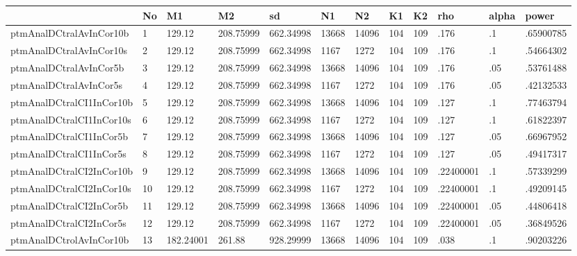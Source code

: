 \begin{table}[htbp]
\begin{tabular}{|l|l|l|l|l|l|l|l|l|l|l|l|}\hline  
 & No  & M1  & M2  & sd  & N1  & N2  & K1  & K2  & rho  & alpha  & power  \\ \hline  
ptmAnalDCtralAvInCor10b & 1 & 129.12 & 208.75999 & 662.34998 & 13668 & 14096 & 104 & 109 & .176 & .1 & .65900785 \\ \hline 
ptmAnalDCtralAvInCor10s & 2 & 129.12 & 208.75999 & 662.34998 & 1167 & 1272 & 104 & 109 & .176 & .1 & .54664302 \\ \hline 
ptmAnalDCtralAvInCor5b & 3 & 129.12 & 208.75999 & 662.34998 & 13668 & 14096 & 104 & 109 & .176 & .05 & .53761488 \\ \hline 
ptmAnalDCtralAvInCor5s & 4 & 129.12 & 208.75999 & 662.34998 & 1167 & 1272 & 104 & 109 & .176 & .05 & .42132533 \\ \hline 
ptmAnalDCtralCI1InCor10b & 5 & 129.12 & 208.75999 & 662.34998 & 13668 & 14096 & 104 & 109 & .127 & .1 & .77463794 \\ \hline 
ptmAnalDCtralCI1InCor10s & 6 & 129.12 & 208.75999 & 662.34998 & 1167 & 1272 & 104 & 109 & .127 & .1 & .61822397 \\ \hline 
ptmAnalDCtralCI1InCor5b & 7 & 129.12 & 208.75999 & 662.34998 & 13668 & 14096 & 104 & 109 & .127 & .05 & .66967952 \\ \hline 
ptmAnalDCtralCI1InCor5s & 8 & 129.12 & 208.75999 & 662.34998 & 1167 & 1272 & 104 & 109 & .127 & .05 & .49417317 \\ \hline 
ptmAnalDCtralCI2InCor10b & 9 & 129.12 & 208.75999 & 662.34998 & 13668 & 14096 & 104 & 109 & .22400001 & .1 & .57339299 \\ \hline 
ptmAnalDCtralCI2InCor10s & 10 & 129.12 & 208.75999 & 662.34998 & 1167 & 1272 & 104 & 109 & .22400001 & .1 & .49209145 \\ \hline 
ptmAnalDCtralCI2InCor5b & 11 & 129.12 & 208.75999 & 662.34998 & 13668 & 14096 & 104 & 109 & .22400001 & .05 & .44806418 \\ \hline 
ptmAnalDCtralCI2InCor5s & 12 & 129.12 & 208.75999 & 662.34998 & 1167 & 1272 & 104 & 109 & .22400001 & .05 & .36849526 \\ \hline 
ptmAnalDCtrolAvInCor10b & 13 & 182.24001 & 261.88 & 928.29999 & 13668 & 14096 & 104 & 109 & .038 & .1 & .90203226 \\ \hline 

\end{tabular}
\end{table}
